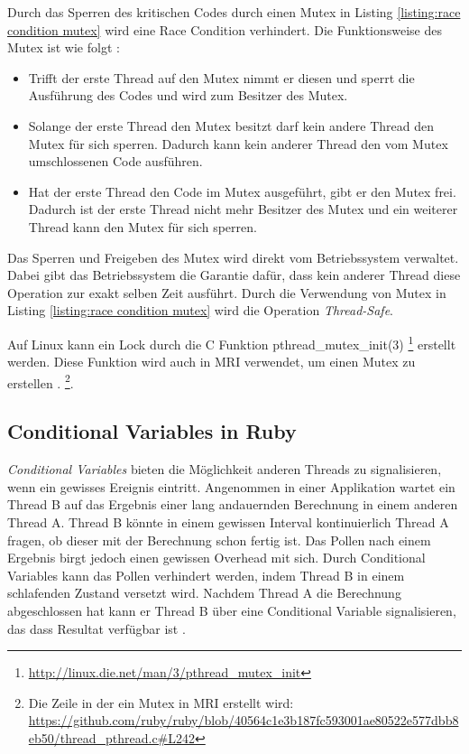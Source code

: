 Durch das Sperren des kritischen Codes durch einen Mutex in Listing \ref{listing:race condition mutex} wird eine Race Condition verhindert. Die Funktionsweise des Mutex ist wie folgt \cite[p. 83-84]{Sto2013}: 

\begin{itemize}
  \item Trifft der erste Thread auf den Mutex nimmt er diesen und sperrt die Ausführung des Codes und wird zum Besitzer des Mutex.
  \item Solange der erste Thread den Mutex besitzt darf kein andere Thread den Mutex für sich sperren. Dadurch kann kein anderer Thread den vom Mutex umschlossenen Code ausführen. 
  \item Hat der erste Thread den Code im Mutex ausgeführt, gibt er den Mutex frei. Dadurch ist der erste Thread nicht mehr Besitzer des Mutex und ein weiterer Thread kann den Mutex für sich sperren.
\end{itemize}

Das Sperren und Freigeben des Mutex wird direkt vom Betriebssystem verwaltet. Dabei gibt das Betriebssystem die Garantie dafür, dass kein anderer Thread diese Operation zur exakt selben Zeit ausführt. Durch die Verwendung von Mutex in Listing \ref{listing:race condition mutex} wird die Operation \emph{Thread-Safe}.

Auf Linux kann ein Lock durch die C Funktion pthread\_mutex\_init(3) \footnote{\url{http://linux.die.net/man/3/pthread_mutex_init}} erstellt werden. Diese Funktion wird auch in MRI verwendet, um einen Mutex zu erstellen \cite[p. 83-84]{Sto2013}. \footnote{Die Zeile in der ein Mutex in MRI erstellt wird: \url{https://github.com/ruby/ruby/blob/40564c1e3b187fc593001ae80522e577dbb8eb50/thread_pthread.c#L242}}.

\subsection{Conditional Variables in Ruby}

\emph{Conditional Variables} bieten die Möglichkeit anderen Threads zu signalisieren, wenn ein gewisses Ereignis eintritt. Angenommen in einer Applikation wartet ein Thread B auf das Ergebnis einer lang andauernden Berechnung in einem anderen Thread A. Thread B könnte in einem gewissen Interval kontinuierlich Thread A fragen, ob dieser mit der Berechnung schon fertig ist. Das Pollen nach einem Ergebnis birgt jedoch einen gewissen Overhead mit sich. Durch Conditional Variables kann das Pollen verhindert werden, indem Thread B in einem schlafenden Zustand versetzt wird. Nachdem Thread A die Berechnung abgeschlossen hat kann er Thread B über eine Conditional Variable signalisieren, das dass Resultat verfügbar ist \cite[p. 748]{tan09} \cite[p. 100]{Sto2013}. 

